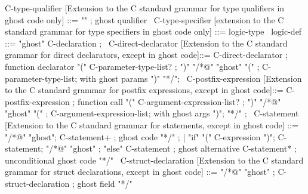 \begin{syntax}

  C-type-qualifier [Extension to the C  standard grammar for type qualifiers in ghost code only] ::= "\ghost" ; ghost qualifier
  \
  C-type-specifier [extension to the C  standard grammar for type specifiers in ghost code only] ::=
    {logic-type}
  \
  logic-def ::= "ghost" C-declaration ;
  \
  C-direct-declarator [Extension to the C  standard grammar for direct declarators, except in ghost code]::=
      C-direct-declarator ; function declarator
      "(" C-parameter-type-list? ;
      ")" "/*@" "ghost" "(" ;
          C-parameter-type-list; with ghost params
      ")" "*/";
  \
  C-postfix-expression [Extension to the C  standard grammar for postfix expressions, except in ghost code]::=
      C-postfix-expression ; function call
      "(" C-argument-expression-list? ;
       ")" "/*@" "ghost" "(" ;
           C-argument-expression-list; with ghost args
       ")";
      "*/" ;
   \
  C-statement [Extension to the C  standard grammar for statements, except in ghost code] ::=
      "/*@" "ghost";
            C-statement+ ; ghost code
      "*/" ;
    | "if" "(" C-expression ")";
       C-statement;
       "/*@" "ghost" ;
             "else" C-statement ; ghost alternative
        C-statement* ; unconditional ghost code
      "*/"
  \
  C-struct-declaration [Extension to the C  standard grammar for struct declarations, except in ghost code] ::=
    {"/*@" "ghost" };
          {C-struct-declaration} ; ghost field
    {"*/"}
\end{syntax}

